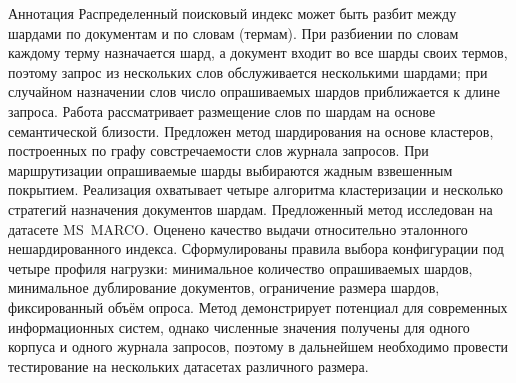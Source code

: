 \documentclass[10pt, a4paper, twoside]{article}
\begin{document}
\thispagestyle{ntvfirst}





\begin{ntvabstract}{Аннотация}
Распределенный поисковый индекс может быть разбит между шардами по документам и по словам (термам).
При разбиении по словам каждому терму назначается шард, а документ входит во все шарды своих термов, поэтому запрос из нескольких слов обслуживается несколькими шардами; при случайном назначении слов число опрашиваемых шардов приближается к длине запроса.
Работа рассматривает размещение слов по шардам на основе семантической близости.
Предложен метод шардирования на основе кластеров, построенных по графу совстречаемости слов журнала запросов.
При маршрутизации опрашиваемые шарды выбираются жадным взвешенным покрытием.
Реализация охватывает четыре алгоритма кластеризации и несколько стратегий назначения документов шардам.
Предложенный метод исследован на датасете MS~MARCO.
Оценено качество выдачи относительно эталонного нешардированного индекса.
Сформулированы правила выбора конфигурации под четыре профиля нагрузки: минимальное количество опрашиваемых шардов, минимальное дублирование документов, ограничение размера шардов, фиксированный объём опроса.
Метод демонстрирует потенциал для современных информационных систем, однако численные значения получены для одного корпуса и одного журнала запросов, поэтому в дальнейшем необходимо провести тестирование на нескольких датасетах различного размера.
\end{ntvabstract}
\end{document}
